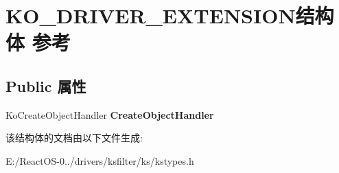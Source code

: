 \hypertarget{struct_k_o___d_r_i_v_e_r___e_x_t_e_n_s_i_o_n}{}\section{K\+O\+\_\+\+D\+R\+I\+V\+E\+R\+\_\+\+E\+X\+T\+E\+N\+S\+I\+O\+N结构体 参考}
\label{struct_k_o___d_r_i_v_e_r___e_x_t_e_n_s_i_o_n}
\subsection*{Public 属性}
\begin{DoxyCompactItemize}
\item 
\mbox{\label{struct_k_o___d_r_i_v_e_r___e_x_t_e_n_s_i_o_n_a476375b5a6973fa446cf7046d25b4e27}} 
Ko\+Create\+Object\+Handler {\bfseries Create\+Object\+Handler}
\end{DoxyCompactItemize}


该结构体的文档由以下文件生成\+:\begin{DoxyCompactItemize}
\item 
E\+:/\+React\+O\+S-\/0../drivers/ksfilter/ks/kstypes.\+h\end{DoxyCompactItemize}

